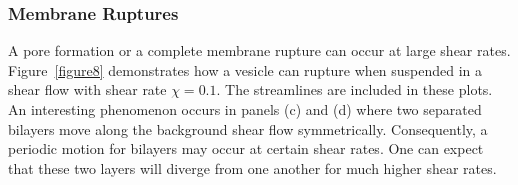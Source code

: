\documentclass[lineno]{jfm}
\begin{document}
\subsubsection{Membrane Ruptures}

A pore formation or a complete membrane rupture can occur at large shear
rates. Figure~\ref{figure8} demonstrates how a vesicle can rupture when
suspended in a shear flow with shear rate $\chi=0.1$. The streamlines
are included in these plots. An interesting phenomenon occurs in panels
(c) and (d) where two separated bilayers move along the background shear
flow symmetrically. Consequently, a periodic motion for bilayers may
occur at certain shear rates. One can expect that these two layers will
diverge from one another for much higher shear rates.
\end{document}
